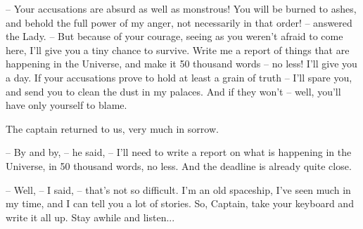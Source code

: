 \documentclass[ebook,twoside,final,openright]{memoir}
\begin{document}
– Your accusations are absurd as well as monstrous! You will be burned to ashes, and behold the full power of my anger, not necessarily in that order! – answered the Lady. – But because of your courage, seeing as you weren’t afraid to come here, I'll give you a tiny chance to survive. Write me a report of things that are happening in the Universe, and make it 50 thousand words – no less! I’ll give you a day. If your accusations prove to hold at least a grain of truth – I'll spare you, and send you to clean the dust in my palaces. And if they won’t – well, you’ll have only yourself to blame.\par
\par
The captain returned to us, very much in sorrow.\par
– By and by, – he said, – I’ll need to write a report on what is happening in the Universe, in 50 thousand words, no less. And the deadline is already quite close.\par
– Well, – I said, – that’s not so difficult. I'm an old spaceship, I’ve seen much in my time, and I can tell you a lot of stories. So, Captain, take your keyboard and write it all up. Stay awhile and listen...
\end{document}
